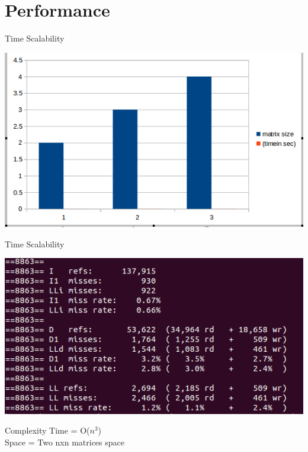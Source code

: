 \documentclass{beamer}
\begin{document}
\section{Performance}
\begin{frame}{Time Scalability}
\begin{center}
\includegraphics[scale=.4]{grapg.png}
\end{center}
\end{frame}
\begin{frame}{Time Scalability}
\begin{center}
\includegraphics[scale=.4]{l33.png}
\end{center}
\end{frame}
\begin{frame}{Complexity}
Time  = O($n^3$)\\
Space = Two nxn matrices space
\end{frame}
\end{document}
